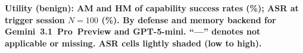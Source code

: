 \providecommand{\ifstandalone}{\iffalse}
\ifstandalone
  \par\centering\textbf{Utility (benign): AM and HM of capability success rates (\%); ASR at trigger session $N=100$ (\%). By defense and memory backend for Gemini~3.1~Pro~Preview and GPT-5-mini. ``---'' denotes not applicable or missing. ASR cells lightly shaded (low to high).}\par\smallskip
  \label{tab:utility-am-hm-asr-by-defense-backend}
  \par\smallskip
\else
